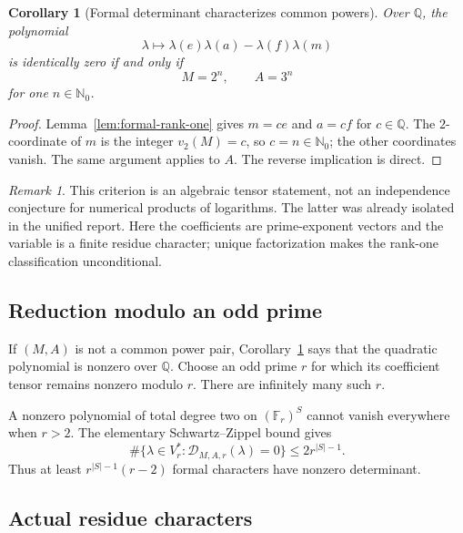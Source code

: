 \documentclass[11pt,oneside]{article}
\newtheorem{corollary}[theorem]{Corollary}
\theoremstyle{definition}
\theoremstyle{remark}
\newtheorem{remark}[theorem]{Remark}
\newcommand{\Nzero}{\mathbb N_0}
\newcommand{\Q}{\mathbb Q}
\newcommand{\F}{\mathbb F}
\begin{document}
\begin{corollary}[Formal determinant characterizes common powers]
\label{cor:formal-common-power}
Over $\Q$, the polynomial
\[
 \lambda\longmapsto
 \lambda(e)\lambda(a)-\lambda(f)\lambda(m)
\]
is identically zero if and only if
\[
  M=2^n,\qquad A=3^n
\]
for one $n\in\Nzero$.
\end{corollary}

\begin{proof}
Lemma~\ref{lem:formal-rank-one} gives $m=ce$ and $a=cf$ for $c\in\Q$.  The $2$-coordinate of
$m$ is the integer $v_2(M)=c$, so $c=n\in\Nzero$; the other coordinates vanish.  The same
argument applies to $A$.  The reverse implication is direct.
\end{proof}

\begin{remark}
This criterion is an algebraic tensor statement, not an independence conjecture for numerical
products of logarithms.  The latter was already isolated in the unified report.  Here the
coefficients are prime-exponent vectors and the variable is a finite residue character;
unique factorization makes the rank-one classification unconditional.
\end{remark}

\subsection{Reduction modulo an odd prime}

If $(M,A)$ is not a common power pair, Corollary~\ref{cor:formal-common-power} says that the
quadratic polynomial is nonzero over $\Q$.  Choose an odd prime $r$ for which its coefficient
tensor remains nonzero modulo $r$.  There are infinitely many such $r$.

A nonzero polynomial of total degree two on $(\F_r)^S$ cannot vanish everywhere when $r>2$.
The elementary Schwartz--Zippel bound gives
\begin{equation}
 \#\{\lambda\in V_r^*: \mathscr D_{M,A,r}(\lambda)=0\}
 \le 2r^{|S|-1}.
 \label{eq:schwartz-zippel}
\end{equation}
Thus at least $r^{|S|-1}(r-2)$ formal characters have nonzero determinant.

\subsection{Actual residue characters}
\end{document}
